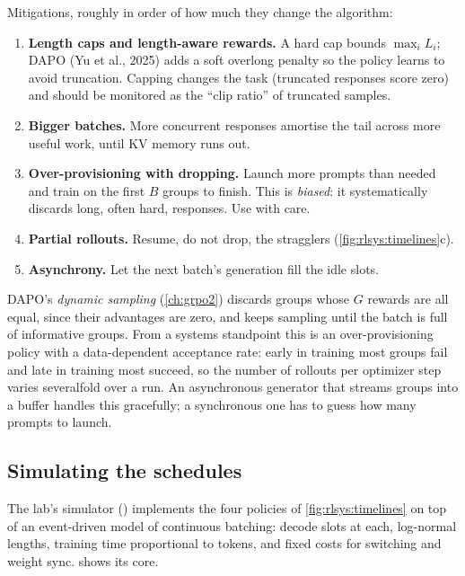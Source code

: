 Mitigations, roughly in order of how much they change the algorithm:
\begin{enumerate}
\item \textbf{Length caps and length-aware rewards.} A hard cap bounds $\max_i L_i$; DAPO
(Yu et al., 2025) adds a soft overlong penalty so the policy learns to avoid truncation.
Capping changes the task (truncated responses score zero) and should be monitored as the
``clip ratio'' of truncated samples.
\item \textbf{Bigger batches.} More concurrent responses amortise the tail across more useful
work, until KV memory runs out.
\item \textbf{Over-provisioning with dropping.} Launch more prompts than needed and train on
the first $B$ groups to finish. This is \emph{biased}: it systematically discards long, often
hard, responses. Use with care.
\item \textbf{Partial rollouts.} Resume, do not drop, the stragglers (\cref{fig:rlsys:timelines}c).
\item \textbf{Asynchrony.} Let the next batch's generation fill the idle slots.
\end{enumerate}

\begin{systemslens}
DAPO's \emph{dynamic sampling} (\cref{ch:grpo2}) discards groups whose $G$ rewards are all
equal, since their advantages are zero, and keeps sampling until the batch is full of
informative groups. From a systems standpoint this is an over-provisioning policy with a
data-dependent acceptance rate: early in training most groups fail and late in training most
succeed, so the number of rollouts per optimizer step varies severalfold over a run. An
asynchronous generator that streams groups into a buffer handles this gracefully; a
synchronous one has to guess how many prompts to launch.
\end{systemslens}

\subsection{Simulating the schedules}

The lab's simulator () implements the four policies of
\cref{fig:rlsys:timelines} on top of an event-driven model of continuous batching:
 decode slots at  each, log-normal lengths, training
time proportional to tokens, and fixed costs for switching and weight sync.
 shows its core.

